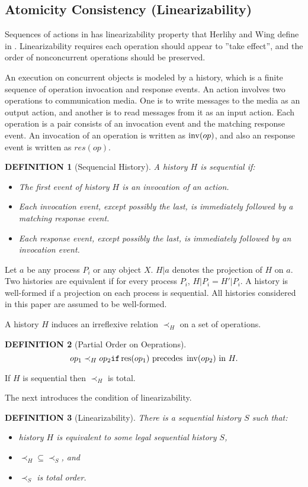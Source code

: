 \documentclass[12pt,a4paper,titlepage]{article}
\theoremstyle{break}
\newtheorem{definition}{DEFINITION}[section]
\begin{document}
\subsection{Atomicity Consistency (Linearizability)}
Sequences of actions in \NHK has linearizability property that Herlihy and Wing define in \cite{Herlihy:1987}.
Linearizability requires each operation should appear to ''take effect'', and the order of nonconcurrent operations should be preserved.

An execution on concurrent objects is modeled by a history, which is a finite sequence of operation invocation and response events.
An action involves two operations to communication media.
One is to write messages to the media as an output action, and another is to read messages from it as an input action.
Each operation is a pair consists of an invocation event and the matching response event.
An invocation of an operation is written as \(\mathop{\mathrm{inv}}\nolimits(op)\), and also an response event is written as \(res(op)\).
  \begin{definition}[Sequencial History]
A history $H$ is sequential if:
    \begin{itemize}
\item The first event of history $H$ is an invocation of an action.
\item Each invocation event, except possibly the last, is immediately followed by a matching response event.
\item Each response event, except possibly the last, is immediately followed by an invocation event.
    \end{itemize}
  \end{definition}
Let $a$ be any process \(P_i\) or any object \(X\).
\(H|a\) denotes the projection of $H$ on $a$.
Two histories are equivalent if for every process \(P_i\), \(H|P_i=H'|P_i\).
A history is well-formed if a projection on each process is sequential.
All histories considered in this paper are assumed to be well-formed.

A history $H$ induces an irreflexive relation \(\prec_{H}\) on a set of operations.
\begin{definition}[Partial Order on Oeprations]
  \begin{displaymath}
op_1\prec_{H}op_2{\tt if }\mathop{\mathrm{res}}\nolimits(op_1)\mbox{ precedes }\mathop{\mathrm{inv}}\nolimits(op_2)\mbox{ in }H.
  \end{displaymath}
\end{definition}
If $H$ is sequential then \(\prec_{H}\) is total.

The next introduces the condition of linearizability.
\begin{definition}[Linearizability]
There is a sequential history $S$ such that:
  \begin{itemize}
\item history $H$ is equivalent to some legal sequential history $S$,
\item \(\prec_{H}\subseteq\prec_{S}\), and
\item \(\prec_{S}\) is total order.
  \end{itemize}
\end{definition}
\end{document}
